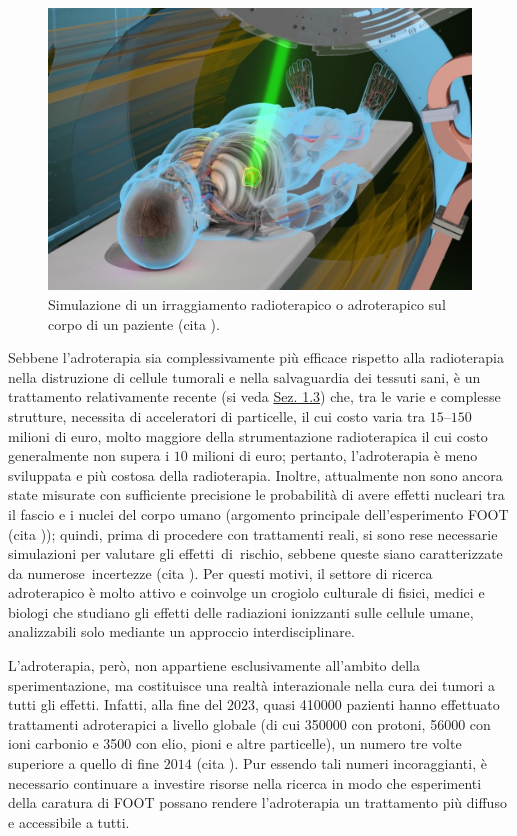 \documentclass[12pt,a4paper,twoside]{report}
\begin{document}
	\begin{figure}[H]
		\centering
		\includegraphics[width=0.9\linewidth]{simulation.jpg}
		\caption{Simulazione di un irraggiamento radioterapico o adroterapico sul corpo di un paziente (cita
			).}
		\label{fig:simulation}
	\end{figure}
	Sebbene l'adroterapia sia complessivamente più efficace rispetto alla radioterapia nella distruzione di cellule tumorali e nella salvaguardia dei tessuti sani, è un trattamento relativamente recente (si veda \hyperref[storia_adroterapia]{Sez. 1.3}) che, tra le varie e complesse strutture, necessita di acceleratori di particelle, il cui costo varia tra $15$--$150$ milioni di euro, molto maggiore della strumentazione radioterapica il cui costo generalmente non supera i $10$ milioni di euro; pertanto, l'adroterapia è meno sviluppata e più costosa della radioterapia. Inoltre, attualmente non sono ancora state misurate con sufficiente precisione le probabilità di avere effetti nucleari tra il fascio e i nuclei del corpo umano (argomento principale dell'esperimento FOOT (cita
	)); quindi, prima di procedere con trattamenti reali, si sono rese necessarie simulazioni per valutare gli effetti di rischio, sebbene queste siano caratterizzate da numerose incertezze (cita
	). Per questi motivi, il settore di ricerca adroterapico è molto attivo e coinvolge un crogiolo culturale di fisici, medici e biologi che studiano gli effetti delle radiazioni ionizzanti sulle cellule umane, analizzabili solo mediante un approccio interdisciplinare.
	
	L'adroterapia, però, non appartiene esclusivamente all'ambito della sperimentazione, ma costituisce una realtà interazionale nella cura dei tumori a tutti gli effetti. Infatti, alla fine del $2023$, quasi \num{410000} pazienti hanno effettuato trattamenti adroterapici a livello globale (di cui \num{350000} con protoni, \num{56000} con ioni carbonio e \num{3500} con elio, pioni e altre particelle), un numero tre volte superiore a quello di fine $2014$ (cita
	). Pur essendo tali numeri incoraggianti, è necessario continuare a investire risorse nella ricerca in modo che esperimenti della caratura di FOOT possano rendere l'adroterapia un trattamento più diffuso e accessibile a tutti.
	
\end{document}

